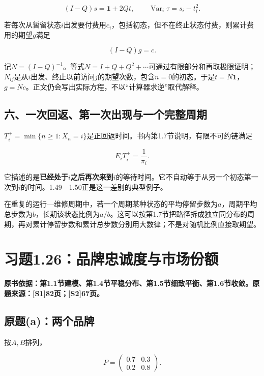 \documentclass[
  11pt,
  a4paper,
  UTF8,
  fontset=fandol]{ctexart}
\begin{document}
\[
(I-Q)s=\boldsymbol1+2Qt,\qquad
\operatorname{Var}_i\tau=s_i-t_i^2.
\]

若每次从暂留状态\(i\)出发要付费用\(c_i\)，包括初态，但不在终止状态付费，则累计费用的期望\(g\)满足

\[
(I-Q)g=c.
\]

记\(N=(I-Q)^{-1}\)。等式\(N=I+Q+Q^2+\cdots\)可通过有限部分和再取极限证明；\(N_{ij}\)是从\(i\)出发、终止以前访问\(j\)的期望次数，包含\(n=0\)的初态。于是\(t=N\boldsymbol1\)，\(g=Nc\)。正文仍会写出实际方程，不以``计算器求逆''取代解释。

\subsection{六、一次回返、第一次出现与一个完整周期}\label{ux516dux4e00ux6b21ux56deux8fd4ux7b2cux4e00ux6b21ux51faux73b0ux4e0eux4e00ux4e2aux5b8cux6574ux5468ux671f}

\(T_i^+=\min\{n\ge1:X_n=i\}\)是正回返时间。书内第1.7节说明，有限不可约链满足

\[
E_iT_i^+=\frac1{\pi_i}.
\]

它描述的是\textbf{已经处于\(i\)之后再次来到\(i\)}的等待时间。它不自动等于从另一个初态第一次到\(i\)的时间。1.49---1.50正是这一差别的典型例子。

在重复的运行---维修周期中，若一个周期某种状态的平均停留步数为\(a\)，周期平均总步数为\(b\)，长期该状态比例为\(a/b\)。这可以按第1.7节把路径拆成独立同分布的周期，再对累计停留步数和累计总步数分别用大数律；不是对随机比例直接取期望。

\newpage

\section{习题1.26：品牌忠诚度与市场份额}\label{ux4e60ux98981.26ux54c1ux724cux5fe0ux8bdaux5ea6ux4e0eux5e02ux573aux4efdux989d}

\textbf{原书依据：第1.1节建模、第1.4节平稳分布、第1.5节细致平衡、第1.6节收敛。原题来源：{[}S1{]}82页；{[}S2{]}67页。}

\subsection{原题(a)：两个品牌}\label{ux539fux9898aux4e24ux4e2aux54c1ux724c}

按\(A,B\)排列，

\[
P=\begin{pmatrix}0.7&0.3\\0.2&0.8\end{pmatrix}.
\]
\end{document}
